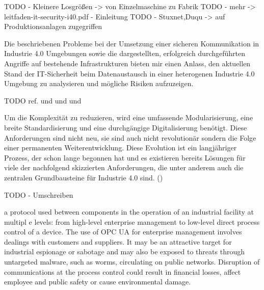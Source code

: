 TODO - Kleinere Losgrößen -> von Einzelmaschine zu Fabrik
TODO - mehr -> leitfaden-it-security-i40.pdf - Einleitung
TODO - Stuxnet,Duqu -> auf Produktionsanlagen zugegriffen

Die beschriebenen Probleme bei der Umsetzung einer sicheren Kommunikation in Industrie 4.0 Umgebungen sowie die dargestellten, erfolgreich durchgeführten Angriffe auf bestehende Infrastrukturen bieten mir einen Anlass, den aktuellen Stand der IT-Sicherheit beim Datenaustausch in einer heterogenen Industrie 4.0 Umgebung zu analysieren und mögliche Risiken aufzuzeigen.

TODO ref. \cite{Halang2016} und \cite{BMWiSuK2016} und \cite{Schleupner2016} und \cite{Sander2014}

Um die Komplexität zu reduzieren, wird eine umfassende Modularisierung, eine breite Standardisierung und eine durchgängige Digitalisierung benötigt. Diese Anforderungen sind nicht neu, sie sind auch nicht revolutionär sondern die Folge einer permanenten Weiterentwicklung. Diese Evolution ist ein langjähriger Prozess, der schon lange begonnen hat und es existieren bereits Lösungen für viele der nachfolgend skizzierten Anforderungen, die unter anderem auch die zentralen Grundbausteine für Industrie 4.0 sind. (\cite{OPCWegbereiter2014})

TODO - Umschreiben

a protocol used between components in the operation of an industrial facility at multipl e
levels: from high-level enterprise management to low-level direct process control of a device. The
use of OPC UA for enterprise management involves dealings with customers and suppliers. It may
be an attractive target for industrial espionage or sabotage and may also be exposed to threats
through untargeted malware, such as worms, circulating on public networks. Disruption of
communications at the process control could result in financial losses, affect employee and public
safety or cause environmental damage.